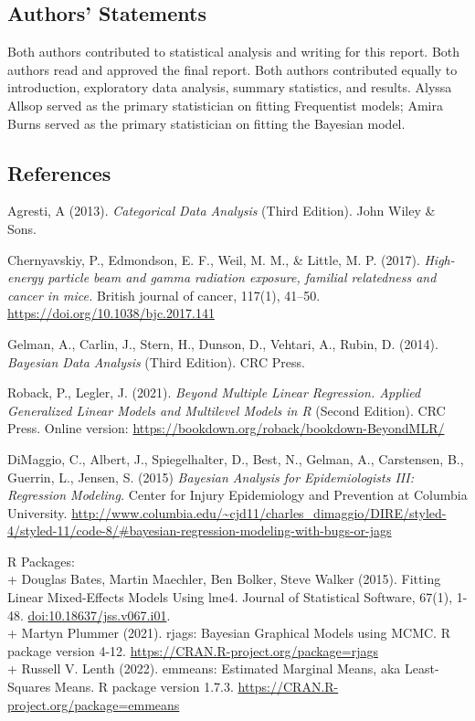 \documentclass[
]{article}
\begin{document}
\hypertarget{authors-statements}{%
\subsection{Authors' Statements}\label{authors-statements}}

Both authors contributed to statistical analysis and writing for this
report. Both authors read and approved the final report. Both authors
contributed equally to introduction, exploratory data analysis, summary
statistics, and results. Alyssa Allsop served as the primary
statistician on fitting Frequentist models; Amira Burns served as the
primary statistician on fitting the Bayesian model.

\hypertarget{references}{%
\subsection{References}\label{references}}

Agresti, A (2013). \emph{Categorical Data Analysis} (Third Edition).
John Wiley \& Sons.

Chernyavskiy, P., Edmondson, E. F., Weil, M. M., \& Little, M. P.
(2017). \emph{High-energy particle beam and gamma radiation exposure,
familial relatedness and cancer in mice.} British journal of cancer,
117(1), 41--50. \url{https://doi.org/10.1038/bjc.2017.141}

Gelman, A., Carlin, J., Stern, H., Dunson, D., Vehtari, A., Rubin, D.
(2014). \emph{Bayesian Data Analysis} (Third Edition). CRC Press.

Roback, P., Legler, J. (2021). \emph{Beyond Multiple Linear Regression.
Applied Generalized Linear Models and Multilevel Models in R} (Second
Edition). CRC Press. Online version:
\url{https://bookdown.org/roback/bookdown-BeyondMLR/}

DiMaggio, C., Albert, J., Spiegelhalter, D., Best, N., Gelman, A.,
Carstensen, B., Guerrin, L., Jensen, S. (2015) \emph{Bayesian Analysis
for Epidemiologists III: Regression Modeling.} Center for Injury
Epidemiology and Prevention at Columbia University.
\url{http://www.columbia.edu/~cjd11/charles_dimaggio/DIRE/styled-4/styled-11/code-8/\#bayesian-regression-modeling-with-bugs-or-jags}

R Packages:\\
+ Douglas Bates, Martin Maechler, Ben Bolker, Steve Walker (2015).
Fitting Linear Mixed-Effects Models Using lme4. Journal of Statistical
Software, 67(1), 1-48. \url{doi:10.18637/jss.v067.i01}.\\
+ Martyn Plummer (2021). rjags: Bayesian Graphical Models using MCMC. R
package version 4-12. \url{https://CRAN.R-project.org/package=rjags}\\
+ Russell V. Lenth (2022). emmeans: Estimated Marginal Means, aka
Least-Squares Means. R package version 1.7.3.
\url{https://CRAN.R-project.org/package=emmeans}
\end{document}
